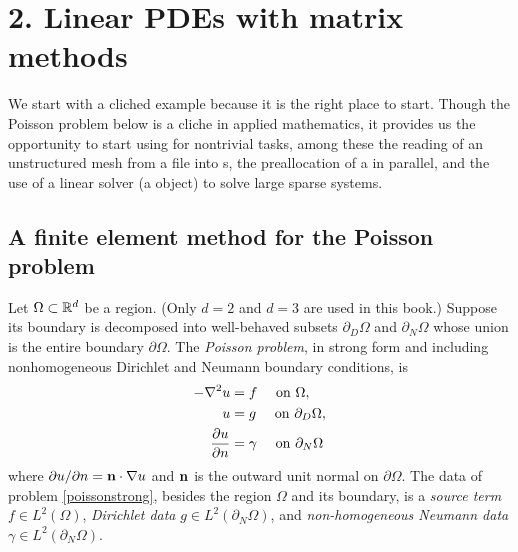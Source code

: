 
\chapter{2. Linear PDEs with matrix methods}

We start with a cliched example because it is the right place to start.  Though the Poisson problem below is a cliche in applied mathematics, it provides us the opportunity to start using \PETSc for nontrivial tasks, among these the reading of an unstructured mesh from a file into \PETSc \pVec s, the preallocation of a \pMat in parallel, and the use of a linear solver (a \pKSP object) to solve large sparse systems.

\section{A finite element method for the Poisson problem}

Let $\Omega \subset \mathbb{R}^d$ be a region.  (Only $d=2$ and $d=3$ are used in this book.)  Suppose its boundary is decomposed into well-behaved subsets $\partial_D \Omega$ and $\partial_N \Omega$ whose union is the entire boundary $\partial \Omega$.  The \emph{Poisson problem}, in strong form and including nonhomogeneous Dirichlet and Neumann boundary conditions, is
\begin{align}
- \nabla^2 u &= f \quad \text{ on } \Omega, \label{poissonstrong} \\
u &= g \quad \text{ on } \partial_D \Omega, \notag \\
\frac{\partial u}{\partial n} &= \gamma \quad \text{ on } \partial_N \Omega \notag
\end{align}
where $\partial u/\partial n = \mathbf{n} \cdot \nabla u$ and $\mathbf{n}$ is the outward unit normal on $\partial \Omega$.  The data of problem \eqref{poissonstrong}, besides the region $\Omega$ and its boundary, is a \emph{source term} $f\in L^2(\Omega)$, \emph{Dirichlet data} $g\in L^2(\partial_N \Omega)$, and \emph{non-homogeneous Neumann data} $\gamma\in L^2(\partial_N \Omega)$.

